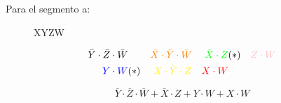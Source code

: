 Para el segmento a:
\begin{figure}[H]
  \centering
    \begin{Karnaugh}{X}{Y}{Z}{W}
    \end{Karnaugh}
\end{figure}

\begin{align*}
  \bar{Y} \cdot \bar{Z} \cdot \bar{W} & &
  \color{orange} \bar{X} \cdot \bar{Y} \cdot \bar{W}& &
  \color{green} \bar{X} \cdot Z & (*) &
  \color{pink} Z \cdot W \\
  \color{blue} Y \cdot W & (*) &
  \color{yellow} X \cdot \bar{Y} \cdot Z & &
  \color{red} X \cdot W &
  \color{black}
\end{align*}

\begin{equation*}
  \bar{Y} \cdot \bar{Z} \cdot \bar{W} +
  \bar{X} \cdot Z +
  Y \cdot W +
  X \cdot W
\end{equation*}
